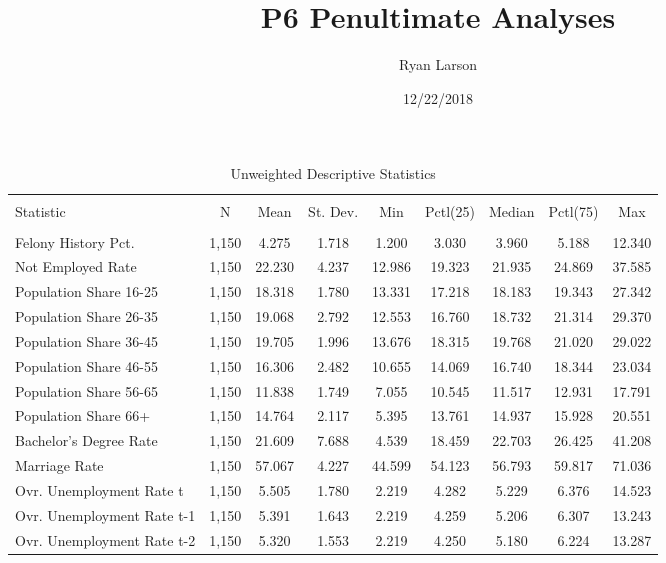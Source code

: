 \documentclass[11pt,]{article}
\title{P6 Penultimate Analyses}
\author{Ryan Larson}
\date{12/22/2018}
\begin{document}
\maketitle

\begin{table}[!htbp] \centering 
  \caption{Unweighted Descriptive Statistics} 
  \label{} 
\begin{tabular}{@{\extracolsep{5pt}}lcccccccc} 
\\[-1.8ex]\hline \\[-1.8ex] 
Statistic & \multicolumn{1}{c}{N} & \multicolumn{1}{c}{Mean} & \multicolumn{1}{c}{St. Dev.} & \multicolumn{1}{c}{Min} & \multicolumn{1}{c}{Pctl(25)} & \multicolumn{1}{c}{Median} & \multicolumn{1}{c}{Pctl(75)} & \multicolumn{1}{c}{Max} \\ 
\hline \\[-1.8ex] 
Felony History Pct. & 1,150 & 4.275 & 1.718 & 1.200 & 3.030 & 3.960 & 5.188 & 12.340 \\ 
Not Employed Rate & 1,150 & 22.230 & 4.237 & 12.986 & 19.323 & 21.935 & 24.869 & 37.585 \\ 
Population Share 16-25 & 1,150 & 18.318 & 1.780 & 13.331 & 17.218 & 18.183 & 19.343 & 27.342 \\ 
Population Share 26-35 & 1,150 & 19.068 & 2.792 & 12.553 & 16.760 & 18.732 & 21.314 & 29.370 \\ 
Population Share 36-45 & 1,150 & 19.705 & 1.996 & 13.676 & 18.315 & 19.768 & 21.020 & 29.022 \\ 
Population Share 46-55 & 1,150 & 16.306 & 2.482 & 10.655 & 14.069 & 16.740 & 18.344 & 23.034 \\ 
Population Share 56-65 & 1,150 & 11.838 & 1.749 & 7.055 & 10.545 & 11.517 & 12.931 & 17.791 \\ 
Population Share 66+ & 1,150 & 14.764 & 2.117 & 5.395 & 13.761 & 14.937 & 15.928 & 20.551 \\ 
Bachelor's Degree Rate & 1,150 & 21.609 & 7.688 & 4.539 & 18.459 & 22.703 & 26.425 & 41.208 \\ 
Marriage Rate & 1,150 & 57.067 & 4.227 & 44.599 & 54.123 & 56.793 & 59.817 & 71.036 \\ 
Ovr. Unemployment Rate t & 1,150 & 5.505 & 1.780 & 2.219 & 4.282 & 5.229 & 6.376 & 14.523 \\ 
Ovr. Unemployment Rate t-1 & 1,150 & 5.391 & 1.643 & 2.219 & 4.259 & 5.206 & 6.307 & 13.243 \\ 
Ovr. Unemployment Rate t-2 & 1,150 & 5.320 & 1.553 & 2.219 & 4.250 & 5.180 & 6.224 & 13.287 \\ 

\end{tabular}
\end{table}
\end{document}
